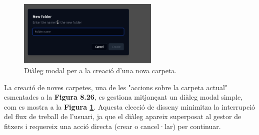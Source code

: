 \begin{figure}[H]
    \centering
    \includegraphics[width=0.6\textwidth]{Figures/ui-web/new_folder_dialog.png}
    \caption{Diàleg modal per a la creació d'una nova carpeta.}
    \label{fig:react-new-folder-impl}
\end{figure}

La creació de noves carpetes, una de les "accions sobre la carpeta actual" esmentades a la \textbf{Figura 8.26}, es gestiona mitjançant un diàleg modal simple, com es mostra a la \textbf{Figura \ref{fig:react-new-folder-impl}}. Aquesta elecció de disseny minimitza la interrupció del flux de treball de l'usuari, ja que el diàleg apareix superposat al gestor de fitxers i requereix una acció directa (crear o cancel·lar) per continuar.

